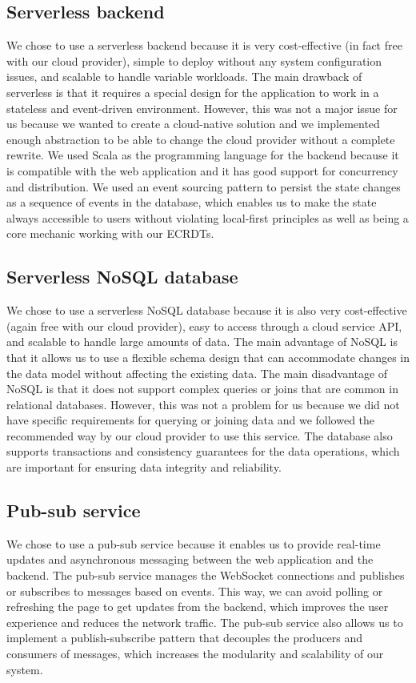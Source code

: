 \documentclass[
	english,
	ruledheaders=section,   %
	class=report,		    %
	thesis={type=bachelor}, %
	accentcolor=9c,			%
	custommargins=true,    %
	marginpar=false,        %
	parskip=half-,          %
	fontsize=11pt,          %
]{tudapub}
\begin{document}
\subsection{Serverless backend} 
We chose to use a serverless backend because it is very cost-effective (in fact free with our cloud provider), simple to deploy without any system configuration issues, and scalable to handle variable workloads. The main drawback of serverless is that it requires a special design for the application to work in a stateless and event-driven environment. However, this was not a major issue for us because we wanted to create a cloud-native solution and we implemented enough abstraction to be able to change the cloud provider without a complete rewrite. We used Scala as the programming language for the backend because it is compatible with the web application and it has good support for concurrency and distribution. We used an event sourcing pattern to persist the state changes as a sequence of events in the database, which enables us to make the state always accessible to users without violating local-first principles as well as being a core mechanic working with our ECRDTs.

\subsection{Serverless NoSQL database} 
We chose to use a serverless NoSQL database because it is also very cost-effective (again free with our cloud provider), easy to access through a cloud service API, and scalable to handle large amounts of data. The main advantage of NoSQL is that it allows us to use a flexible schema design that can accommodate changes in the data model without affecting the existing data. The main disadvantage of NoSQL is that it does not support complex queries or joins that are common in relational databases. However, this was not a problem for us because we did not have specific requirements for querying or joining data and we followed the recommended way by our cloud provider to use this service. The database also supports transactions and consistency guarantees for the data operations, which are important for ensuring data integrity and reliability.

\subsection{Pub-sub service}
We chose to use a pub-sub service because it enables us to provide real-time updates and asynchronous messaging between the web application and the backend. The pub-sub service manages the WebSocket connections and publishes or subscribes to messages based on events. This way, we can avoid polling or refreshing the page to get updates from the backend, which improves the user experience and reduces the network traffic. The pub-sub service also allows us to implement a publish-subscribe pattern that decouples the producers and consumers of messages, which increases the modularity and scalability of our system.
\end{document}
